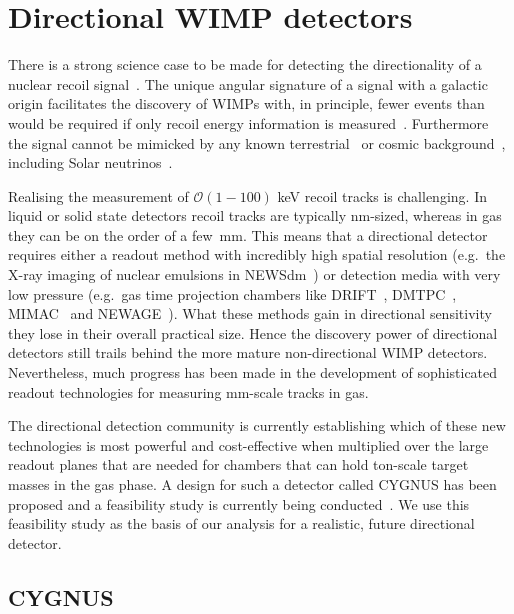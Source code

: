 \documentclass[prd,10pt,twocolumn,showpacs,nofootinbib,aps,superscriptaddress,preprintnumbers]{revtex4-1}
\begin{document}
\section{Directional WIMP detectors}\label{sec:directional}


There is a strong science case to be made for detecting the directionality of a nuclear recoil signal~\cite{Mayet:2016zxu}. The unique angular signature of a signal with a galactic origin facilitates the discovery of WIMPs with, in principle, fewer events than would be required if only recoil energy information is measured~\cite{Green:2010zm}. Furthermore the signal cannot be mimicked by any known terrestrial~\cite{Leyton:2017tza} or cosmic background~\cite{Mei:2005gm}, including Solar neutrinos~\cite{Grothaus:2014hja, O'Hare:2015mda, OHare:2017rag}. 

Realising the measurement of $\mathcal{O}(1-100)$ keV recoil tracks is challenging. In liquid or solid state detectors recoil tracks are typically nm-sized, whereas in gas they can be on the order of a few~mm. This means that a directional detector requires either a readout method with incredibly high spatial resolution (e.g.\ the X-ray imaging of nuclear emulsions in NEWSdm~\cite{Aleksandrov:2016fyr,Agafonova:2017ajg}) or detection media with very low pressure (e.g.\ gas time projection chambers like DRIFT~\cite{Daw:2011wq,Battat:2014van,Battat:2016xaw}, DMTPC~\cite{Monroe:2011er,Leyton:2016nit}, MIMAC~\cite{Santos:2011kf,Riffard:2013psa} and NEWAGE~\cite{Nakamura:2015iza}). What these methods gain in directional sensitivity they lose in their overall practical size. Hence the discovery power of directional detectors still trails behind the more mature non-directional WIMP detectors. Nevertheless, much progress has been made in the development of sophisticated readout technologies for measuring mm-scale tracks in gas. 

The directional detection community is currently establishing which of these new technologies is most powerful and cost-effective when multiplied over the large readout planes that are needed for chambers that can hold ton-scale target masses in the gas phase. A design for such a detector called CYGNUS has been proposed and a feasibility study is currently being conducted~\cite{CYGNUS}. 
We use this feasibility study as the basis of our analysis for a realistic, future directional detector. 

\subsection{CYGNUS}
\end{document}
